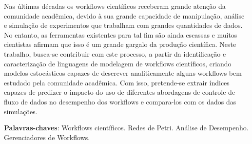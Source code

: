 \begin{resumo}

	Nas últimas décadas os workflows científicos receberam grande atenção da comunidade acadêmica, devido à sua grande capacidade de manipulação, análise e simulação de experimentos que trabalham com grandes quantidades de dados. No entanto, as ferramentas existentes para tal fim são ainda escassas e muitos cientistas afirmam que isso é um grande gargalo da produção científica. Neste trabalho, busca-se contribuir com este processo, a partir da identificação e caracterização de linguagens de modelagem de workflows científicos, criando modelos estocásticos capazes de descrever analiticamente alguns workflows bem estudado pela comunidade acadêmica. Com isso, pretende-se extrair índices capazes de predizer o impacto do uso de diferentes abordagens de controle de fluxo de dados no desempenho dos workflows e compara-los com os dados das simulações.

 \vspace{\onelineskip}
 
 \noindent
 \textbf{Palavras-chaves}: Workflows científicos. Redes de Petri. Análise de Desempenho. Gerenciadores de Workflows.
\end{resumo}
